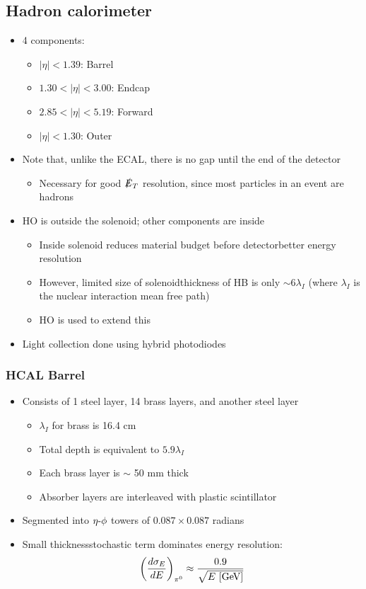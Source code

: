 \subsection{Hadron calorimeter} 
\begin{itemize}
  \item 4 components:
  \begin{itemize}
    \item $|\eta|<1.39$: Barrel
    \item $1.30 < |\eta| < 3.00$: Endcap
    \item $2.85 < |\eta| < 5.19$: Forward
    \item $|\eta| < 1.30$: Outer
  \end{itemize}
  \item Note that, unlike the ECAL, there is no gap until the end of the detector
  \begin{itemize}
    \item Necessary for good $\slashed E_T$ resolution, since most particles in an event are hadrons
  \end{itemize}
  \item HO is outside the solenoid; other components are inside
  \begin{itemize}
    \item Inside solenoid reduces material budget before detector\thus better energy resolution
    \item However, limited size of solenoid\thus thickness of HB is only $\sim 6 \lambda_I$ (where $\lambda_I$ is the nuclear interaction mean free path)
    \item HO is used to extend this
  \end{itemize}
  \item Light collection done using hybrid photodiodes
\end{itemize}

\subsubsection{HCAL Barrel}
\begin{itemize}
  \item Consists of 1 steel layer, 14 brass layers, and another steel layer
  \begin{itemize}
    \item $\lambda_I$ for brass is 16.4 cm
    \item Total depth is equivalent to $5.9\lambda_I$
    \item Each brass layer is $\sim$ 50 mm thick
    \item Absorber layers are interleaved with plastic scintillator
  \end{itemize}
  \item Segmented into $\eta\textto\phi$ towers of $0.087\times0.087$ radians
  \item Small thickness\thus stochastic term dominates energy resolution:
  \begin{equation}
    \left(\dfrac{d \sigma_E}{d E}\right)_{\pi^0} \approx \frac{0.9}{\sqrt{E~[\text{GeV}]}}
  \end{equation}
\end{itemize}

